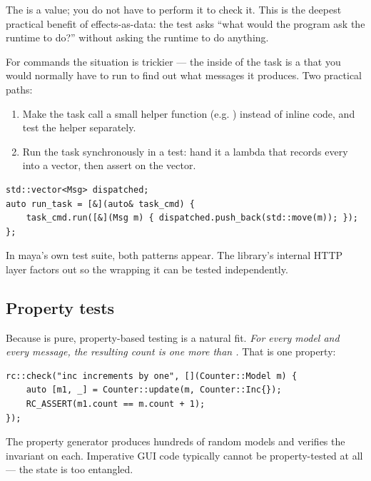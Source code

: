The  is a value; you do not have to perform it to check it.
This is the deepest practical benefit of effects-as-data: the test
asks ``what would the program ask the runtime to do?'' without
asking the runtime to do anything.

For  commands the situation is trickier --- the inside of
the task is a  that you would normally have to
run to find out what messages it produces. Two practical paths:

\begin{enumerate}[leftmargin=*]
  \item Make the task call a small helper function (e.g.
    ) instead of inline code, and test the
    helper separately.
  \item Run the task synchronously in a test: hand it a lambda that
    records every  into a vector, then assert on the
    vector.
\end{enumerate}

\begin{lstlisting}
std::vector<Msg> dispatched;
auto run_task = [&](auto& task_cmd) {
    task_cmd.run([&](Msg m) { dispatched.push_back(std::move(m)); });
};
\end{lstlisting}

In maya's own test suite, both patterns appear. The library's
internal HTTP layer factors out  so the
 wrapping it can be tested independently.

\subsection{Property tests}

Because  is pure, property-based testing is a natural
fit. \emph{For every model  and every  message,
the resulting count is one more than .} That is one
 property:

\begin{lstlisting}
rc::check("inc increments by one", [](Counter::Model m) {
    auto [m1, _] = Counter::update(m, Counter::Inc{});
    RC_ASSERT(m1.count == m.count + 1);
});
\end{lstlisting}

The property generator produces hundreds of random models and
verifies the invariant on each. Imperative GUI code typically cannot
be property-tested at all --- the state is too entangled.

